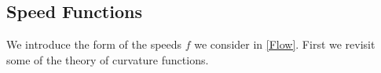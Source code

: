 


\subsection{Speed Functions}
\label{subsec:bg_speed}
We introduce the form of the speeds $f$ we consider in \eqref{Flow}. First we revisit some of the theory of curvature functions.


